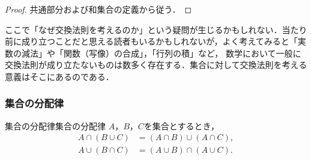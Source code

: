 \documentclass[a4paper,11pt]{ltjsarticle}
\newenvironment{tleftbar}{\begin{tbleftline}\setlength{\parindent}{1\zw}}{\end{tbleftline}}
\begin{document}
\begin{tleftbar}
  \begin{proof}
    共通部分および和集合の定義から従う．
  \end{proof}
\end{tleftbar}

\begin{mycolumn}
  ここで「なぜ交換法則を考えるのか」という疑問が生じるかもしれない．当たり前に成り立つことだと思える読者もいるかもしれないが，よく考えてみると「実数の減法」や「関数（写像）の合成」，「行列の積」など，
  数学において一般に交換法則が成り立たないものは数多く存在する．集合に対して交換法則を考える意義はそこにあるのである．
\end{mycolumn}

\subsubsection{集合の分配律}

\begin{prop}{集合の分配律}{集合の分配律}
  $A$，$B$，$C$を集合とするとき，
  \begin{align*}
    A \cap ( B \cup C) & = (A \cap B) \cup (A \cap C), \\
    A \cup ( B \cap C) & = (A \cup B) \cap (A \cup C).
  \end{align*}
\end{prop}
\end{document}
